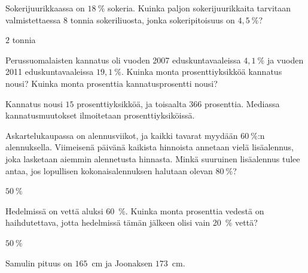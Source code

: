\begin{tehtavasivu}
\begin{tehtava}
    Sokerijuurikkaassa on $18~\%$ sokeria. Kuinka paljon sokerijuurikkaita tarvitaan valmistettaessa
    $8$ tonnia sokeriliuosta, jonka sokeripitoisuus on $4,5~\%$?
    \begin{vastaus}
        $2$ tonnia
    \end{vastaus}
\end{tehtava}

\begin{tehtava}
    Perussuomalaisten kannatus oli vuoden 2007 eduskuntavaaleissa $4,1~\%$ ja 
    vuoden 2011 eduskuntavaaleissa $19,1~\%$. Kuinka monta prosenttiyksikköä 
    kannatus nousi? Kuinka monta prosenttia kannatusprosentti nousi?
    \begin{vastaus}
        Kannatus nousi $15$ prosenttiyksikköä, ja toisaalta $366$ prosenttia.
        Mediassa kannatusmuutokset ilmoitetaan prosenttiyksiköissä.
    \end{vastaus}
\end{tehtava}

\begin{tehtava}
    Askartelukaupassa on alennusviikot, ja kaikki tavarat myydään $60~\%$:n 
    alennuksella. Viimeisenä päivänä kaikista hinnoista annetaan vielä 
    lisäalennus, joka lasketaan aiemmin alennetusta hinnasta. Minkä suuruinen 
    lisäalennus tulee antaa, jos lopullisen kokonaisalennuksen halutaan olevan $80~\%$?
    \begin{vastaus}
        $50~\%$
    \end{vastaus}
\end{tehtava}

\begin{tehtava}
    Hedelmissä on vettä aluksi 60~\%. Kuinka monta prosenttia vedestä on 
    haihdutettava, jotta hedelmissä tämän jälkeen olisi vain 20~\% vettä?
    \begin{vastaus}
        $50~\%$
    \end{vastaus}
\end{tehtava}


\begin{tehtava}
    Samulin pituus on $165$~cm ja Joonaksen $173$~cm.
    \begin{alakohdat}
    \end{alakohdat}
    \begin{vastaus}
        \begin{alakohdat}
        \end{alakohdat}
    \end{vastaus}
\end{tehtava}


\end{tehtavasivu}
